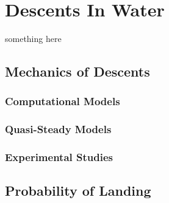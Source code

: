 \chapter{Descents In Water}
\label{cha:descentsinwater}

something here

\section{Mechanics of Descents}
\label{sec:mod}

\subsection{Computational Models}
\label{subsec:mod-compmodels}

\subsection{Quasi-Steady Models}
\label{subsec:mod-quasimodels}

\subsection{Experimental Studies}
\label{subsec:mod-experimental}

\section{Probability of Landing}
\label{sec:pol}

